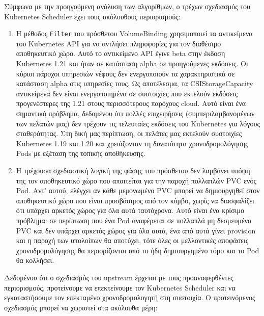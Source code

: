 Σύμφωνα με την προηγούμενη ανάλυση των αλγορίθμων, ο τρέχων σχεδιασμός του
Kubernetes Scheduler έχει τους ακόλουθους περιορισμούς:

\begin{enumerate}
      \item Η μέθοδος \texttt{Filter} του πρόσθετου VolumeBinding χρησιμοποιεί
            τα αντικείμενα  του Kubernetes API για να
            αντλήσει πληροφορίες για τον διαθέσιμο αποθηκευτικό χώρο. Αυτό το
            αντικείμενο API έγινε beta στην έκδοση Kubernetes 1.21 και ήταν σε
            κατάσταση alpha σε προηγούμενες εκδόσεις. Οι κύριοι πάροχοι
            υπηρεσιών νέφους δεν ενεργοποιούν τα χαρακτηριστικά σε κατάσταση
            alpha στις υπηρεσίες τους. Ως αποτέλεσμα, τα CSIStorageCapacity
            αντικείμενα δεν είναι ενεργοποιημένα σε συστοιχίες που εκτελούν
            εκδόσεις προγενέστερες της 1.21 στους περισσότερους παρόχους cloud.
            Αυτό είναι ένα σημαντικό πρόβλημα, δεδομένου ότι πολλές επιχειρήσεις
            (συμπεριλαμβανομένων των πελατών μας) δεν τρέχουν τις τελευταίες
            εκδόσεις του Kubernetes για λόγους σταθερότητας. Στη δική μας
            περίπτωση, οι πελάτες μας εκτελούν συστοιχίες Kubernetes 1.19 και
            1.20 και χρειάζονταν τη δυνατότητα χρονοδρομολόγησης Pods με εξέταση
            της τοπικής αποθήκευσης.
      \item Η τρέχουσα σχεδιαστική λογική της φάσης  του πρόσθετου
             δεν λαμβάνει υπόψη της τον αποθηκευτικό χώρο που
            απαιτείται για την παροχή πολλαπλών PVC ενός Pod. Αντ' αυτού,
            ελέγχει αν κάθε μεμονωμένο PVC μπορεί να δημιουργηθεί στον
            αποθηκευτικό χώρο που είναι προσβάσιμος από τον κόμβο, χωρίς να
            διασφαλίζει ότι υπάρχει αρκετός χώρος για όλα αυτά ταυτόχρονα. Αυτό
            είναι ένα κρίσιμο πρόβλημα: σε περίπτωση που ένα Pod αναφέρεται σε
            πολλαπλά μη δεσμευμένα PVC και δεν υπάρχει αρκετός χώρος για όλα
            αυτά, ένα από αυτά γίνει provision και η παροχή των υπολοίπων θα
            αποτύχει, τότε όλες οι μελλοντικές αποφάσεις χρονοδρομολόγησης θα
            περιορίζονται από το ήδη δημιουργημένο τόμο και το Pod θα κολλήσει.
\end{enumerate}

Δεδομένου ότι ο σχεδιασμός του upstream έρχεται με τους προαναφερθέντες
περιορισμούς, προτείνουμε να επεκτείνουμε τον Kubernetes Scheduler και να
εγκαταστήσουμε τον επεκταμένο χρονοδρομολογητή στη συστοιχία. Ο προτεινόμενος
σχεδιασμός μπορεί να χωριστεί στα ακόλουθα μέρη:

